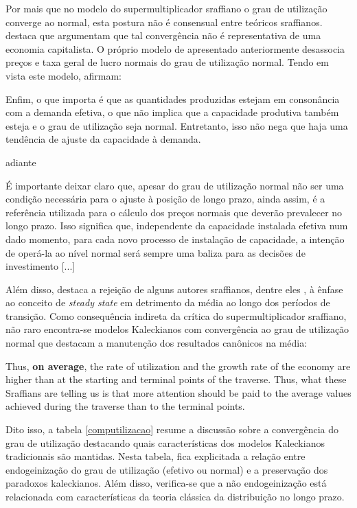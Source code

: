 Por mais que no modelo do supermultiplicador sraffiano o grau de utilização converge ao normal, esta postura não é consensual entre teóricos sraffianos. \textcite[p.~161]{cesaratto_neo-kaleckian_2015} destaca que \textcites{garegnani_notes_1992}{palumbo_growth_2003} argumentam que tal convergência não é representativa de uma economia capitalista. O próprio modelo de \textcite[Orignial de 1986]{ciccone_2017} apresentado anteriormente desassocia preços e taxa geral de lucro normais do grau de utilização normal. Tendo em vista este modelo, \textcite[p.~476]{moreira_demanda_2018} afirmam:

\begin{citacao}
 Enfim, o que importa é que as
quantidades produzidas estejam em consonância com a demanda efetiva, o que não
implica que a capacidade produtiva também esteja e o grau de utilização seja normal.
Entretanto, isso não nega que haja uma tendência de ajuste da capacidade à demanda.
\end{citacao}
adiante
\begin{citacao}
É importante deixar claro que, apesar do grau de utilização normal não ser
uma condição necessária para o ajuste à posição de longo prazo, ainda assim, é a
referência utilizada para o cálculo dos preços normais que deverão prevalecer no
longo prazo. Isso significa que, independente da capacidade instalada efetiva num
dado momento, para cada novo processo de instalação de capacidade, a intenção de
operá-la ao nível normal será sempre uma baliza para as decisões de investimento [...]
\cite[p.~477]{moreira_demanda_2018}
\end{citacao}

Além disso, \textcite[p.~408]{lavoie_post-keynesian_2015} destaca a rejeição de alguns autores sraffianos, dentre eles \textcite{palumbo_growth_2003}, à ênfase ao conceito de \textit{steady state} em detrimento da média ao longo dos períodos de transição. Como consequência indireta da crítica do supermultiplicador sraffiano, não raro encontra-se modelos Kaleckianos com convergência ao grau de utilização normal que destacam a manutenção dos resultados canônicos na média:

\begin{citacao}
Thus, \textbf{on average}, the rate of utilization and the growth rate of the
economy are higher than at the starting and terminal points of the traverse. Thus, what
these Sraffians are telling us is that more attention should be paid to the average values
achieved during the traverse than to the terminal points.
\cite[p.~408, grifos adicionados]{lavoie_post-keynesian_2015}
\end{citacao}
Dito isso, a tabela \ref{computilizacao} resume a discussão sobre a convergência do grau de utilização destacando quais características dos modelos Kaleckianos tradicionais são mantidas. Nesta tabela, fica explicitada a relação entre endogeinização do grau de utilização (efetivo ou normal) e a preservação dos paradoxos kaleckianos. Além disso, verifica-se que a não endogeinização está relacionada com características da teoria clássica da distribuição no longo prazo.


